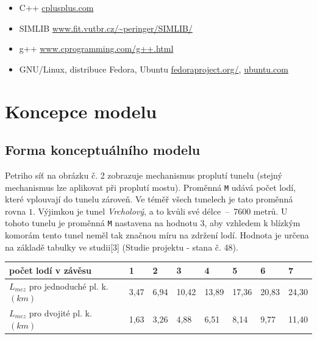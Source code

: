 \documentclass[11pt,a4paper]{article}
\begin{document}
      \begin{itemize}
        \item C++ \href{http://www.cplusplus.com/}{cplusplus.com}
        \item SIMLIB
          \href{http://www.fit.vutbr.cz/~peringer/SIMLIB/}
               {www.fit.vutbr.cz/\textasciitilde peringer/SIMLIB/}
        \item g++ \href{http://www.cprogramming.com/g++.html}
                       {www.cprogramming.com/g++.html}
        \item GNU/Linux, distribuce Fedora, Ubuntu
          \href{http://fedoraproject.org/}{fedoraproject.org/},
          \href{http://ubuntu.com}{ubuntu.com}
      \end{itemize}

  \section{Koncepce modelu}

    \subsection{Forma konceptuálního modelu}


      Petriho síť na obrázku č. 2 zobrazuje mechanismus proplutí tunelu
     (stejný mechanismus lze aplikovat při proplutí mostu).
      Proměnná \texttt{M} udává počet lodí, které vplouvají do tunelu zároveň.
      Ve téměř všech tunelech je tato proměnná rovna $1$. Výjimkou je tunel
      \textit{Vrcholový}, a to kvůli své délce \,--\, 7600 metrů. U tohoto
      tunelu je proměnná \texttt{M} nastavena na hodnotu $3$, aby vzhledem k
      blízkým komorám tento tunel neměl tak značnou míru na zdržení lodí.
      Hodnota je určena na základě tabulky ve
      studii[3] (Studie projektu - stana č. 48).

      \begin{center}
        \begin{tabular}{| l | l | l | l | l | l | l | l |}
          \hline
          počet lodí v závěsu & 1 & 2 & 3 & 4 & 5 & 6 & 7 \\ \hline
          $L_{mez}$ pro jednoduché pl. k. $(km)$
            & 3,47 & 6,94 & 10,42 & 13,89 & 17,36 & 20,83 & 24,30 \\ \hline
          $L_{mez}$ pro dvojité pl. k. $(km)$
            & 1,63 & 3,26 &  4,88 &  6,51 &  8,14 &  9,77 & 11,40 \\ \hline
          \end{tabular}
      \end{center}
\end{document}
